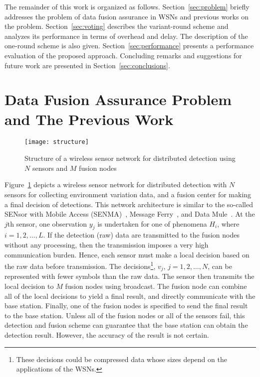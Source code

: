 \documentclass[12pt, onecolumn, draftcls]{IEEEtran}
\begin{document}
The remainder of this work is organized as follows.
Section~\ref{sec:problem} briefly addresses the problem of data
fusion assurance in WSNs and previous works on the problem.
Section~\ref{sec:voting} describes the variant-round scheme and
analyzes its performance in terms of overhead and delay. The
description of the one-round scheme is also given.
Section~\ref{sec:performance} presents a performance evaluation of
the proposed approach. Concluding remarks and suggestions for future
work are presented in Section~\ref{sec:conclusions}.

\section{Data Fusion Assurance Problem and The Previous Work}
\begin{figure}
\centering
\texttt{[image: structure]}
\caption{Structure of a wireless sensor network for distributed
detection using $N$ sensors and $M$ fusion nodes}
\label{fig:structure}
\end{figure}
\label{sec:problem}Figure~\ref{fig:structure} depicts a wireless
sensor network for distributed detection with $N$ sensors for
collecting environment variation data, and a fusion center for
making a final decision of detections. This network architecture is
similar to the so-called SENsor with Mobile Access
(SENMA)~\cite{yang:misinformed,tong:senma}, Message
Ferry~\cite{zhao:ferrying}, and Data Mule~\cite{shah:mules}. At the
$j$th sensor, one observation $y_j$ is undertaken for one of
phenomena $H_i$, where $i=1,2,\ldots,L$. If the detection (raw) data
are transmitted to the fusion nodes without any processing, then the
transmission imposes a very high communication burden. Hence, each
sensor must make a local decision based on the raw data before
transmission. The decisions\footnote{These decisions could be
compressed data whose sizes depend on the applications of the
WSNs.}, $v_j$, $j=1,2,\ldots,N$, can be represented with fewer
symbols than the raw data. The sensor then transmits the local
decision to $M$ fusion nodes using broadcast. The fusion node can
combine all of the local decisions to yield a final result, and
directly communicate with the base station. Finally, one of the
fusion nodes is specified to send the final result to the base
station. Unless all of the fusion nodes or all of the sensors fail,
this detection and fusion scheme can guarantee that the base station
can obtain the detection result. However, the accuracy of the result
is not certain.
\end{document}
